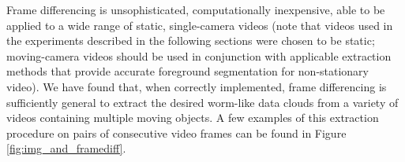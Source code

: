 \documentclass[smallcondensed, final]{svjour3}
\newcommand{\willie}[1]{\textcolor{green}{\textsf{\emph{\textbf{\textcolor{green}{#1}}}}}}
\begin{document}
Frame differencing is unsophisticated, computationally inexpensive, able to be applied to a wide range of static, single-camera videos (note that videos used in the experiments described in the following sections were chosen to be static; moving-camera videos should be used in conjunction with applicable extraction methods that provide accurate foreground segmentation for non-stationary video). We have found that, when correctly implemented, frame differencing is sufficiently general to extract the desired worm-like data clouds from a variety of videos containing multiple moving objects. A few examples of this extraction procedure on pairs of consecutive video frames can be found in Figure \ref{fig:img_and_framediff}.

\end{document}
